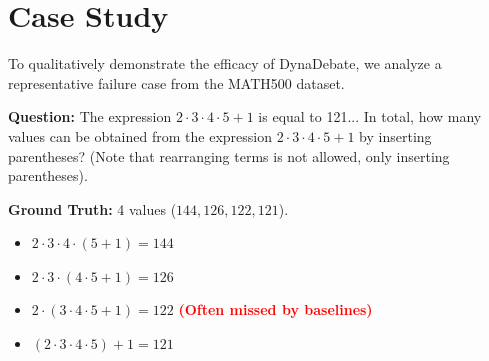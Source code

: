 \section{Case Study}
\label{app:case_study}

To qualitatively demonstrate the efficacy of DynaDebate, we analyze a representative failure case from the MATH500 dataset.

\begin{tcolorbox}[
    colback=white,
    colframe=black!70,
    boxrule=0.8pt,
    title=\textbf{Problem Example (MATH500)},
    fonttitle=\small\sffamily\bfseries,
    sharp corners,
    bottom=5pt
]
    \small
    \textbf{Question:} The expression $2\cdot 3 \cdot 4\cdot 5+1$ is equal to 121... In total, how many values can be obtained from the expression $2\cdot 3\cdot 4 \cdot 5 + 1$ by inserting parentheses? (Note that rearranging terms is not allowed, only inserting parentheses).

    \vspace{0.2cm}
    \textbf{Ground Truth:} 4 values ($144, 126, 122, 121$).
    \begin{itemize}[nosep, leftmargin=1em]
        \item $2\cdot 3 \cdot 4 \cdot (5 + 1) = 144$
        \item $2\cdot 3 \cdot (4 \cdot 5 + 1) = 126$
        \item $2\cdot (3 \cdot 4 \cdot 5 + 1) = 122$  \textcolor{red}{\textbf{(Often missed by baselines)}}
        \item $(2\cdot 3 \cdot 4 \cdot 5) + 1 = 121$
    \end{itemize}
\end{tcolorbox}

